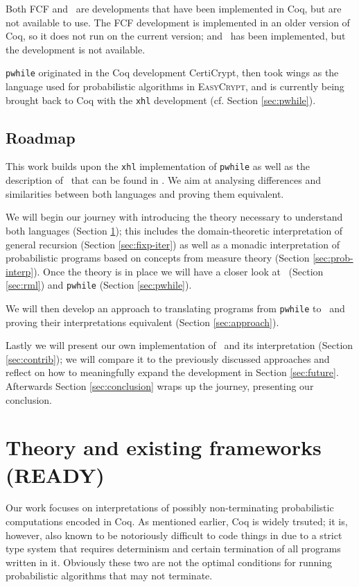 \documentclass[11pt, leqno, titlepage]{article}
\theoremstyle{definition}
\begin{document}
Both FCF and \rml\ are developments that have been implemented in Coq, but are not
available to use. The FCF development is implemented in an older version of Coq, so
it does not run on the current version; and \rml\ has been implemented, but the
development is not available.

\texttt{pwhile} originated in the Coq development CertiCrypt, then took wings as the
language used for probabilistic algorithms in \textsc{EasyCrypt}, and is currently
being brought back to Coq with the \texttt{xhl} development (cf. Section
\ref{sec:pwhile}).

\subsection{Roadmap}
This work builds upon the \texttt{xhl} implementation of \texttt{pwhile} as well as
the description of \rml\ that can be found in \cite{rml-paper}. We aim at analysing
differences and similarities between both languages and proving them equivalent.

We will begin our journey with introducing the theory necessary to understand both
languages (Section \ref{sec:theory}); this includes the domain-theoretic
interpretation of general recursion (Section \ref{sec:fixp-iter}) as well as a
monadic interpretation of probabilistic programs based on concepts from measure
theory (Section \ref{sec:prob-interp}). Once the theory is in place we will have a
closer look at \rml\ (Section \ref{sec:rml}) and \texttt{pwhile} (Section
\ref{sec:pwhile}).

We will then develop an approach to translating programs from \texttt{pwhile} to
\rml\ and proving their interpretations equivalent (Section \ref{sec:approach}).

Lastly we will present our own implementation of \rml\ and its interpretation
(Section \ref{sec:contrib}); we will compare it to the previously discussed
approaches and reflect on how to meaningfully expand the development in Section
\ref{sec:future}. Afterwards Section \ref{sec:conclusion} wraps up the journey,
presenting our conclusion.


\section{Theory and existing frameworks (READY)} 
\label{sec:theory}

Our work focuses on interpretations of possibly non-terminating probabilistic
computations encoded in Coq. As mentioned earlier, Coq is widely trsuted; it is,
however, also known to be notoriously difficult to code things in due to a strict
type system that requires determinism and certain termination of all programs written
in it. Obviously these two are not the optimal conditions for running probabilistic
algorithms that may not terminate.
\end{document}
